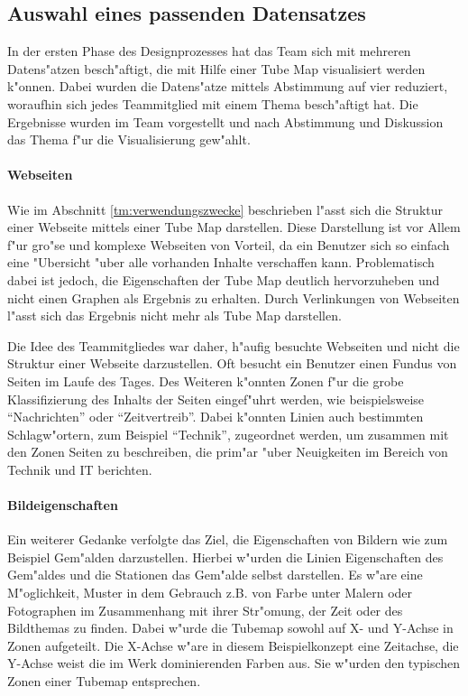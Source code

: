 
\subsection{Auswahl eines passenden Datensatzes}
In der ersten Phase des Designprozesses hat das Team sich mit mehreren Datens"atzen besch"aftigt, die mit Hilfe einer Tube Map visualisiert werden k"onnen. Dabei wurden die Datens"atze mittels Abstimmung auf vier reduziert, woraufhin sich jedes Teammitglied mit einem Thema besch"aftigt hat. Die Ergebnisse wurden im Team vorgestellt und nach Abstimmung und Diskussion das Thema f"ur die Visualisierung gew"ahlt.

\paragraph{Webseiten}
Wie im Abschnitt \ref{tm:verwendungszwecke} beschrieben l"asst sich die Struktur einer Webseite mittels einer Tube Map darstellen.  Diese Darstellung ist vor Allem f"ur gro"se und komplexe Webseiten von Vorteil, da ein Benutzer sich so einfach eine "Ubersicht "uber alle vorhanden Inhalte verschaffen kann. Problematisch dabei ist jedoch, die Eigenschaften der Tube Map deutlich hervorzuheben und nicht einen Graphen als Ergebnis zu erhalten. Durch Verlinkungen von Webseiten l"asst sich das Ergebnis nicht mehr als Tube Map darstellen.

Die Idee des Teammitgliedes war daher, h"aufig besuchte Webseiten und nicht die Struktur einer Webseite darzustellen. Oft besucht ein Benutzer einen Fundus von Seiten im Laufe des Tages. Des Weiteren k"onnten Zonen f"ur die grobe Klassifizierung des Inhalts der Seiten eingef"uhrt werden, wie beispielsweise "`Nachrichten"' oder "`Zeitvertreib"'. Dabei k"onnten Linien auch bestimmten Schlagw"ortern, zum Beispiel "`Technik"', zugeordnet werden, um zusammen mit den Zonen Seiten zu beschreiben, die prim"ar "uber Neuigkeiten im Bereich von Technik und IT berichten. 

\paragraph{Bildeigenschaften}
\label{dp:bildeigenschaften}
Ein weiterer Gedanke verfolgte das Ziel, die Eigenschaften von Bildern wie zum Beispiel Gem"alden darzustellen. Hierbei w"urden die Linien Eigenschaften des Gem"aldes und die Stationen das Gem"alde selbst darstellen. Es w"are eine M"oglichkeit, Muster in dem Gebrauch z.B. von Farbe unter Malern oder Fotographen im Zusammenhang mit ihrer Str"omung, der Zeit oder des Bildthemas zu finden. Dabei w"urde die Tubemap sowohl auf X- und Y-Achse in Zonen aufgeteilt. Die X-Achse w"are in diesem Beispielkonzept eine Zeitachse, die Y-Achse weist die im Werk dominierenden Farben aus. Sie w"urden den typischen Zonen einer Tubemap entsprechen.

